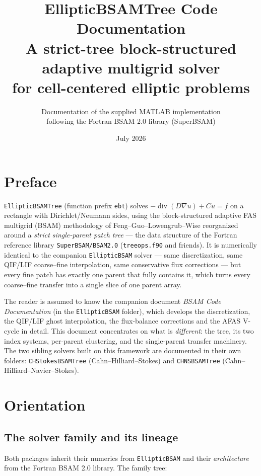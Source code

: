 \documentclass[11pt,oneside,openany]{book}
\title{\bfseries EllipticBSAMTree Code Documentation\\[6pt]
\Large A strict-tree block-structured adaptive multigrid solver\\
for cell-centered elliptic problems}
\author{Documentation of the supplied MATLAB implementation\\
\small following the Fortran BSAM 2.0 library (SuperBSAM)}
\date{July 2026}
\newcommand{\code}[1]{\textnormal{\texttt{#1}}}
\DeclareMathOperator{\divop}{div}
\begin{document}
\frontmatter
\maketitle
\tableofcontents

\chapter*{Preface}

\code{EllipticBSAMTree} (function prefix \code{ebt}) solves
$-\divop(D\nabla u)+Cu=f$ on a rectangle with Dirichlet/Neumann sides,
using the block-structured adaptive FAS multigrid (BSAM) methodology of
Feng--Guo--Lowengrub--Wise \cite{feng2018} reorganized around a
\emph{strict single-parent patch tree} --- the data structure of the
Fortran reference library \code{SuperBSAM/BSAM2.0}
(\code{treeops.f90} and friends).  It is numerically identical to the
companion \code{EllipticBSAM} solver --- same discretization, same
QIF/LIF coarse--fine interpolation, same conservative flux corrections
--- but every fine patch has exactly one parent that fully contains it,
which turns every coarse--fine transfer into a single slice of one
parent array.

The reader is assumed to know the companion document \emph{BSAM Code
Documentation} (in the \code{EllipticBSAM} folder), which develops the
discretization, the QIF/LIF ghost interpolation, the flux-balance
corrections and the AFAS V-cycle in detail.  This document concentrates
on what is \emph{different}: the tree, its two index systems, per-parent
clustering, and the single-parent transfer machinery.  The two sibling
solvers built on this framework are documented in their own folders:
\code{CHStokesBSAMTree} (Cahn--Hilliard--Stokes) and \code{CHNSBSAMTree}
(Cahn--Hilliard--Navier--Stokes).

\mainmatter

\chapter{Orientation}
\label{ch:orientation}

\section{The solver family and its lineage}

Both packages inherit their numerics from \code{EllipticBSAM} and their
\emph{architecture} from the Fortran BSAM 2.0 library.  The family tree:
\end{document}
